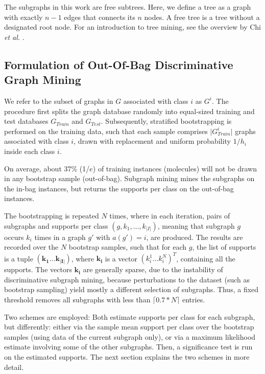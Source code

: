\documentclass{article}
\begin{document}
The subgraphs in this work are free subtrees. Here, we define a tree as a graph
with exactly $n-1$ edges that connects its $n$ nodes. A free tree is a tree
without a designated root node. For an introduction to tree mining, see the
overview by Chi \emph{et al.} \cite{CMNK01Frequent}.

\subsection{Formulation of Out-Of-Bag Discriminative Graph Mining}
\label{ss:oob-dgm}

We refer to the subset of graphs in $G$ associated with class $i$ as $G^i$.
The procedure first splits the graph database randomly into equal-sized
training and test databases $G_{Train}$ and $G_{Test}$. Subsequently,
stratified bootstrapping is performed on the training data, such that each
sample comprises $\vert G_{Train}^i\vert$ graphs associated with class $i$,
drawn with replacement and uniform probability $1/h_i$ inside each class $i$.

On average, about 37\% (1/$e$) of training instances (molecules) will not be
drawn in any bootstrap sample (out-of-bag). Subgraph mining
mines the subgraphs on the in-bag instances, but returns the supports per class
on the out-of-bag instances.  

The bootstrapping is repeated $N$ times, where in each iteration, pairs of
subgraphs and supports per class $(g,k_1,\ldots,k_{\vert I\vert})$, meaning
that subgraph $g$ occurs $k_i$ times in a graph $g'$ with $a(g')=i$, are
produced.  The results are recorded over the $N$ bootstrap samples, such that
for each $g$, the list of supports is a tuple
$(\mathbf{k_1}\ldots\mathbf{k_{\vert I\vert}})$, where $\mathbf{k_i}$ is a
vector $(k_i^1\ldots k_i^N)^T$, containing all the supports.  The vectors
$\mathbf{k_i}$ are generally sparse, due to the instability of discriminative
subgraph mining, because perturbations to the dataset (such as bootstrap
sampling) yield mostly a different selection of subgraphs. Thus, a fixed
threshold removes all subgraphs with less than $\lceil0.7*N\rceil$ entries.

Two schemes are employed: Both estimate supports per class for each subgraph,
but differently: either via the sample mean support per class over the
bootstrap samples (using data of the current subgraph only), or via  a maximum
likelihood estimate involving some of the other subgraphs.  Then, a
significance test is run on the estimated supports.  The next section explains
the two schemes in more detail.
\end{document}
